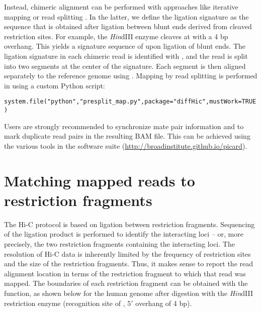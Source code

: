 \documentclass{report}\usepackage[]{graphicx}\usepackage[usenames,dvipsnames]{color}
\newcommand{\hlnum}[1]{\textcolor[rgb]{0.816,0.125,0.439}{#1}}%
\newcommand{\hlstr}[1]{\textcolor[rgb]{0.251,0.627,0.251}{#1}}%
\newcommand{\hlstd}[1]{\textcolor[rgb]{0.251,0.251,0.251}{#1}}%
\newcommand{\hlkwc}[1]{\textcolor[rgb]{0.251,0.251,0.251}{#1}}%
\newcommand{\hlkwd}[1]{\textcolor[rgb]{0.878,0.439,0.125}{#1}}%
\newenvironment{knitrout}{}{} %
\begin{document}
Instead, chimeric alignment can be performed with approaches like iterative mapping \cite{imakaev2012iterative} or read splitting \cite{seitan2013cohesin}.
In the latter, we define the ligation signature as the sequence that is obtained after ligation between blunt ends derived from cleaved restriction sites.
For example, the \textit{Hin}dIII enzyme cleaves at  with a 4 bp overhang.
This yields a signature sequence of  upon ligation of blunt ends.
The ligation signature in each chimeric read is identified with  \cite{martin2011cutadapt}, and the read is split into two segments at the center of the signature.
Each segment is then aligned separately to the reference genome using  \cite{langmead2012bowtie}.
Mapping by read splitting is performed in  using a custom Python script:

\begin{knitrout}
\color{fgcolor}\begin{kframe}
\begin{alltt}
\hlkwd{system.file}\hlstd{(}\hlstr{"python"}\hlstd{,} \hlstr{"presplit_map.py"}\hlstd{,} \hlkwc{package}\hlstd{=}\hlstr{"diffHic"}\hlstd{,} \hlkwc{mustWork}\hlstd{=}\hlnum{TRUE}\hlstd{)}
\end{alltt}
\end{kframe}
\end{knitrout}

Users are strongly recommended to synchronize mate pair information and to mark duplicate read pairs in the resulting BAM file.
This can be achieved using the various tools in the  software suite (\url{http://broadinstitute.github.io/picard}).

\section{Matching mapped reads to restriction fragments}
The Hi-C protocol is based on ligation between restriction fragments.
Sequencing of the ligation product is performed to identify the interacting loci --  or, more precisely, the two restriction fragments containing the interacting loci.
The resolution of Hi-C data is inherently limited by the frequency of restriction sites and the size of the restriction fragments.
Thus, it makes sense to report the read alignment location in terms of the restriction fragment to which that read was mapped.
The boundaries of each restriction fragment can be obtained with the  function, as shown below for the human genome after digestion with the \textit{Hin}dIII restriction enzyme (recognition site of , 5$'$ overhang of 4 bp).
\end{document}
